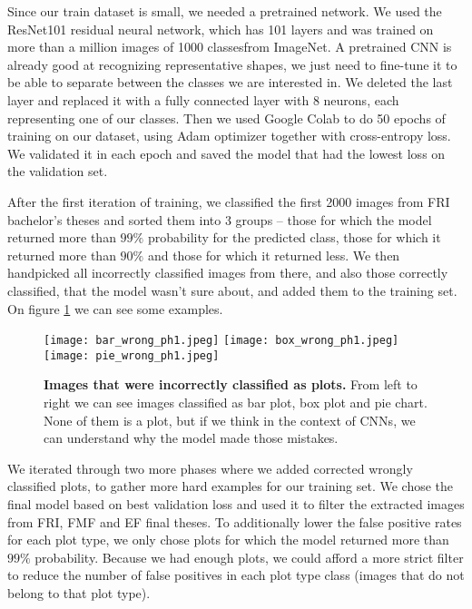 \documentclass[fleqn,moreauthors,10pt]{ds_report}
\begin{document}
Since our train dataset is small, we needed a pretrained network. We used the ResNet101 residual neural network, which has 101 layers and was trained on more than a million images of 1000 classesfrom ImageNet. A pretrained CNN is already good at recognizing representative shapes, we just need to fine-tune it to be able to separate between the classes we are interested in. We deleted the last layer and replaced it with a fully connected layer with 8 neurons, each representing one of our classes. Then we used Google Colab to do 50 epochs of training on our dataset, using Adam optimizer together with cross-entropy loss. We validated it in each epoch and saved the model that had the lowest loss on the validation set.

After the first iteration of training, we classified the first 2000 images from FRI bachelor's theses and sorted them into 3 groups -- those for which the model returned more than $99\%$ probability for the predicted class, those for which it returned more than $90\%$ and those for which it returned less. We then handpicked all incorrectly classified images from there, and also those correctly classified, that the model wasn't sure about, and added them to the training set. On figure \ref{wrong phase1} we can see some examples.

\begin{figure}[h]
	\texttt{[image: bar\_wrong\_ph1.jpeg]}
	\texttt{[image: box\_wrong\_ph1.jpeg]}
	\texttt{[image: pie\_wrong\_ph1.jpeg]}
	\caption{\textbf{Images that were incorrectly classified as plots.} From left to right we can see images classified as bar plot, box plot and pie chart. None of them is a plot, but if we think in the context of CNNs, we can understand why the model made those mistakes.}
	\label{wrong phase1}
\end{figure}

We iterated through two more phases where we added corrected wrongly classified plots, to gather more hard examples for our training set.
We chose the final model based on best validation loss and used it to filter the extracted images from FRI, FMF and EF final theses. To additionally lower the false positive rates for each plot type, we only chose plots for which the model returned more than $99\%$ probability. Because we had enough plots, we could afford a more strict filter to reduce the number of false positives in each plot type class (images that do not belong to that plot type).
\end{document}
